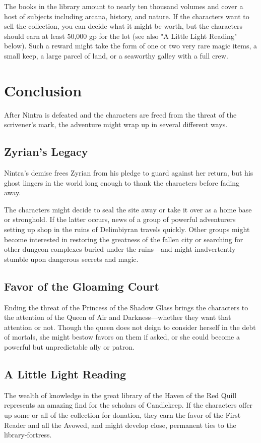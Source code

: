 \documentclass[10pt,a4paper,twoside,bg=print,twocolumn,openany,nodeprecatedcode]{dndbook}
\begin{document}
The books in the library amount to nearly ten thousand volumes and cover a host of subjects including arcana, history, and nature. If the characters want to sell the collection, you can decide what it might be worth, but the characters should earn at least 50,000 gp for the lot (see also "A Little Light Reading" below). Such a reward might take the form of one or two very rare magic items, a small keep, a large parcel of land, or a seaworthy galley with a full crew.

\section{Conclusion}
After Nintra is defeated and the characters are freed from the threat of the scrivener's mark, the adventure might wrap up in several different ways.

\subsection{Zyrian's Legacy}
Nintra's demise frees Zyrian from his pledge to guard against her return, but his ghost lingers in the world long enough to thank the characters before fading away.

The characters might decide to seal the site away or take it over as a home base or stronghold. If the latter occurs, news of a group of powerful adventurers setting up shop in the ruins of Delimbiyran travels quickly. Other groups might become interested in restoring the greatness of the fallen city or searching for other dungeon complexes buried under the ruins—and might inadvertently stumble upon dangerous secrets and magic.

\subsection{Favor of the Gloaming Court}
Ending the threat of the Princess of the Shadow Glass brings the characters to the attention of the Queen of Air and Darkness—whether they want that attention or not. Though the queen does not deign to consider herself in the debt of mortals, she might bestow favors on them if asked, or she could become a powerful but unpredictable ally or patron.

\subsection{A Little Light Reading}
The wealth of knowledge in the great library of the Haven of the Red Quill represents an amazing find for the scholars of Candlekeep. If the characters offer up some or all of the collection for donation, they earn the favor of the First Reader and all the Avowed, and might develop close, permanent ties to the library-fortress.
\end{document}
